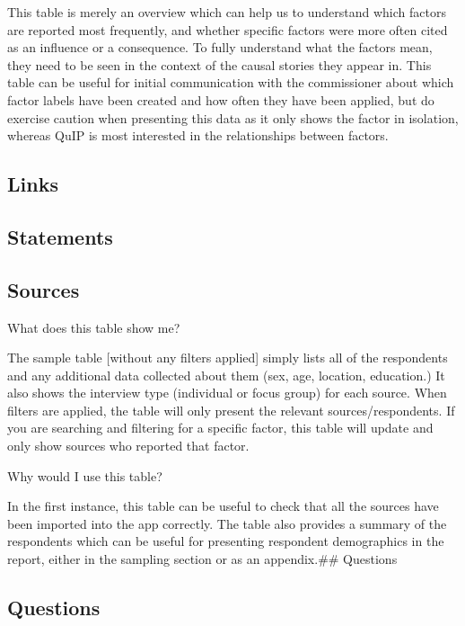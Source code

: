 \documentclass[
]{book}
\begin{document}
This table is merely an overview which can help us to understand which factors are reported most frequently, and whether specific factors were more often cited as an influence or a consequence. To fully understand what the factors mean, they need to be seen in the context of the causal stories they appear in. This table can be useful for initial communication with the commissioner about which factor labels have been created and how often they have been applied, but do exercise caution when presenting this data as it only shows the factor in isolation, whereas QuIP is most interested in the relationships between factors.

\hypertarget{links}{%
\subsection{Links}\label{links}}

\hypertarget{statements}{%
\subsection{Statements}\label{statements}}

\hypertarget{sources}{%
\subsection{Sources}\label{sources}}

What does this table show me?

The sample table {[}without any filters applied{]} simply lists all of the respondents and any additional data collected about them (sex, age, location, education.) It also shows the interview type (individual or focus group) for each source. When filters are applied, the table will only present the relevant sources/respondents. If you are searching and filtering for a specific factor, this table will update and only show sources who reported that factor.

Why would I use this table?

In the first instance, this table can be useful to check that all the sources have been imported into the app correctly. The table also provides a summary of the respondents which can be useful for presenting respondent demographics in the report, either in the sampling section or as an appendix.\#\# Questions

\hypertarget{questions}{%
\subsection{Questions}\label{questions}}
\end{document}
